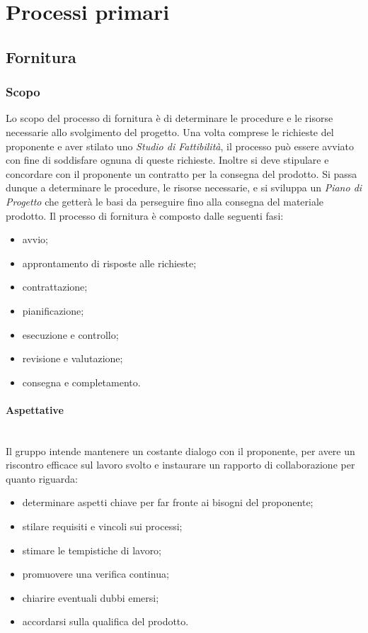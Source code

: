 \section{Processi primari}

\subsection{Fornitura}

\subsubsection{Scopo}
Lo scopo del processo di fornitura è di determinare le procedure e le risorse 
necessarie allo svolgimento del progetto. Una volta comprese le richieste del 
proponente e aver stilato uno \textit{Studio di Fattibilità}, il processo può 
essere avviato con fine di soddisfare ognuna di queste richieste. Inoltre si 
deve stipulare e concordare con il proponente un contratto per la consegna del 
prodotto. Si passa dunque a determinare le procedure, le risorse necessarie, e 
si sviluppa un \textit{Piano di Progetto} che getterà le basi da perseguire fino 
alla consegna del materiale prodotto.
Il processo di fornitura è composto dalle seguenti fasi:
	\begin{itemize}
		\item avvio;
		\item approntamento di risposte alle richieste;
		\item contrattazione;
		\item pianificazione;
		\item esecuzione e controllo;
		\item revisione e valutazione;
		\item consegna e completamento.
	\end{itemize}
	
\paragraph{Aspettative} \mbox{}\\ 

\noindent Il gruppo intende mantenere un costante dialogo con il proponente, per avere un 
riscontro efficace sul lavoro svolto e instaurare un rapporto di collaborazione 
per quanto riguarda:
	\begin{itemize}
		\item determinare aspetti chiave per far fronte ai bisogni del proponente;
		\item stilare requisiti e vincoli sui processi;
		\item stimare le tempistiche di lavoro;
		\item promuovere una verifica continua;
		\item chiarire eventuali dubbi emersi;
		\item accordarsi sulla qualifica del prodotto.
	\end{itemize}
	
